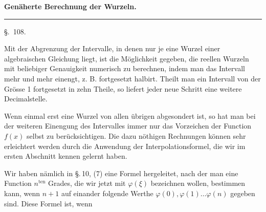 
\begin{center}

\textbf{Gen\"aherte Berechnung der Wurzeln.}

\rule{3cm}{0.4pt}

\S.\ 108.

\end{center}

Mit der Abgrenzung der Intervalle, in denen nur je eine Wurzel einer algebraischen Gleichung liegt, ist die M\"oglichkeit gegeben, die reellen Wurzeln mit beliebiger Genauigkeit numerisch zu berechnen, indem man das Intervall mehr und mehr einengt, z. B. fortgesetzt halbirt. Theilt man ein Intervall von der Gr\"osse 1 fortgesetzt in zehn Theile, so liefert jeder neue Schritt eine weitere Decimalstelle.

Wenn einmal erst eine Wurzel von allen \"ubrigen abgesondert ist, so hat man bei der weiteren Einengung des Intervalles immer nur das Vorzeichen der Function $f(x)$ selbst zu ber\"ucksichtigen. Die dazu n\"othigen Rechnungen k\"onnen sehr erleichtert werden durch die Anwendung der Interpolationsformel, die wir im ersten Abschnitt kennen gelernt haben.

Wir haben n\"amlich in \S.\,10, (7) eine Formel hergeleitet, nach der man eine Function $n^{\mathrm{ten}}$ Grades, die wir jetzt mit $\varphi(\xi)$ bezeichnen wollen, bestimmen kann, wenn $n+1$ auf einander folgende Werthe $\varphi(0), \varphi(1) \ldots \varphi(n)$ gegeben sind. Diese Formel ist, wenn
